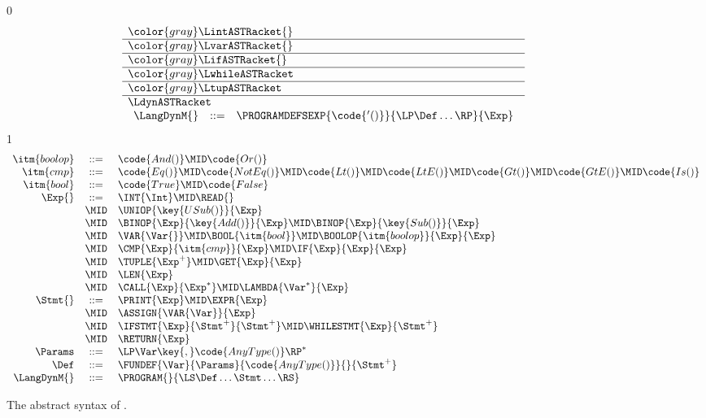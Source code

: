 \documentclass[7x10]{TimesAPriori_MIT}%
\newcommand{\gray}[1]{{\color{gray} #1}}
\def\racketEd{0}
\def\pythonEd{1}
\def\edition{1}
\newcommand{\pythonColor}[0]{}
\numberwithin{theorem}{chapter}
\numberwithin{definition}{chapter}
\numberwithin{equation}{chapter}
\begin{document}
\begin{figure}[tp]
\centering
\begin{tcolorbox}[colback=white]
    \small
{\if\edition\racketEd
\[
\begin{array}{l}
  \gray{\LintASTRacket{}} \\ \hline
  \gray{\LvarASTRacket{}} \\ \hline
  \gray{\LifASTRacket{}} \\ \hline
  \gray{\LwhileASTRacket} \\ \hline
  \gray{\LtupASTRacket} \\  \hline
\LdynASTRacket \\
\begin{array}{lcl}
  \LangDynM{} &::=& \PROGRAMDEFSEXP{\code{'()}}{\LP\Def\ldots\RP}{\Exp} 
\end{array}
\end{array}
\]
\fi}
{\if\edition\pythonEd\pythonColor
\[
\begin{array}{rcl}
\itm{boolop} &::=& \code{And()} \MID \code{Or()} \\
\itm{cmp} &::= & \code{Eq()} \MID \code{NotEq()} \MID \code{Lt()}
   \MID \code{LtE()} \MID \code{Gt()} \MID \code{GtE()} 
   \MID \code{Is()} \\
\itm{bool} &::=& \code{True} \MID \code{False} \\
\Exp{} &::=& \INT{\Int} \MID \READ{} \\
  &\MID& \UNIOP{\key{USub()}}{\Exp}\\
  &\MID&  \BINOP{\Exp}{\key{Add()}}{\Exp}  
    \MID  \BINOP{\Exp}{\key{Sub()}}{\Exp} \\
    &\MID& \VAR{\Var{}} 
  \MID \BOOL{\itm{bool}} 
     \MID \BOOLOP{\itm{boolop}}{\Exp}{\Exp}\\
  &\MID& \CMP{\Exp}{\itm{cmp}}{\Exp}  \MID \IF{\Exp}{\Exp}{\Exp} \\
  &\MID& \TUPLE{\Exp^{+}} \MID \GET{\Exp}{\Exp} \\
  &\MID& \LEN{\Exp} \\
  &\MID& \CALL{\Exp}{\Exp^{*}} \MID \LAMBDA{\Var^{*}}{\Exp} \\
\Stmt{} &::=& \PRINT{\Exp} \MID \EXPR{\Exp} \\
  &\MID& \ASSIGN{\VAR{\Var}}{\Exp}\\
  &\MID& \IFSTMT{\Exp}{\Stmt^{+}}{\Stmt^{+}} 
  \MID \WHILESTMT{\Exp}{\Stmt^{+}}\\
  &\MID& \RETURN{\Exp} \\
\Params &::=& \LP\Var\key{,}\code{AnyType()}\RP^*   \\
\Def &::=& \FUNDEF{\Var}{\Params}{\code{AnyType()}}{}{\Stmt^{+}}  \\
\LangDynM{} &::=& \PROGRAM{}{\LS \Def \ldots \Stmt \ldots \RS}
\end{array}
\]
\fi}
\end{tcolorbox}

\caption{The abstract syntax of \LangDyn{}.}
\label{fig:r7-syntax}
\end{figure}
\end{document}

